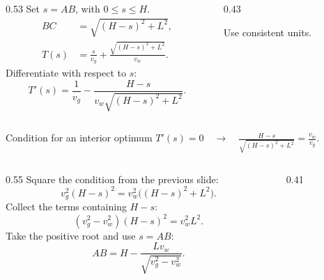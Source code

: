 \begin{solutionframe}
  \small
  \begin{columns}[T,onlytextwidth]
    \begin{column}{0.53\textwidth}
      Set $s=AB$, with $0\le s\le H$.
      \[
        \begin{aligned}
          BC&=\sqrt{(H-s)^2+L^2},\\
          T(s)&=\frac{s}{v_g}
            +\frac{\sqrt{(H-s)^2+L^2}}{v_w}.
        \end{aligned}
      \]
      Differentiate with respect to $s$:
      \[
        T'(s)=\frac{1}{v_g}
          -\frac{H-s}{v_w\sqrt{(H-s)^2+L^2}}.
      \]
    \end{column}
    \begin{column}{0.43\textwidth}
      \centering
      \resizebox{!}{0.33\paperheight}{}\par Use consistent units.
    \end{column}
  \end{columns}
  \begin{block}{Condition for an interior optimum}
    \centering\(\displaystyle
      T'(s)=0
      \quad\to\quad
      \frac{H-s}{\sqrt{(H-s)^2+L^2}}=\frac{v_w}{v_g}.
    \)
  \end{block}
\end{solutionframe}

\begin{solutionframe}
  \small
  \begin{columns}[T,onlytextwidth]
    \begin{column}{0.55\textwidth}
      Square the condition from the previous slide:
      \[
        v_g^2(H-s)^2=v_w^2\bigl((H-s)^2+L^2\bigr).
      \]
      Collect the terms containing $H-s$:
      \[
        (v_g^2-v_w^2)(H-s)^2=v_w^2L^2.
      \]
      Take the positive root and use $s=AB$:
      \[
        AB=H-\frac{Lv_w}{\sqrt{v_g^2-v_w^2}}.
      \]
    \end{column}
    \begin{column}{0.41\textwidth}
      \centering
      \resizebox{!}{0.33\paperheight}{}
    \end{column}
  \end{columns}
\end{solutionframe}

